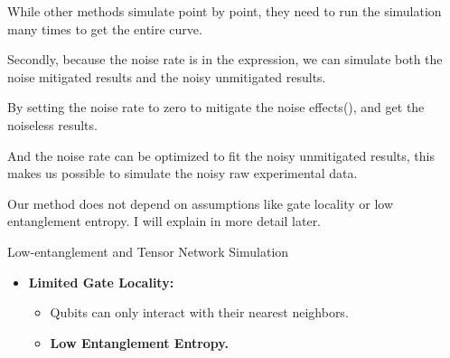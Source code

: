 \documentclass[10pt]{beamer}
\begin{document}
\begin{CJK}{UTF8}{gbsn}
{  While other methods simulate point by point, they need to run the simulation many times to get the entire curve.

  Secondly, because the noise rate is in the expression, we can simulate both the noise mitigated results and the noisy unmitigated results.
  
  By setting the noise rate to zero to mitigate the noise effects(), and get the noiseless results. 

  And the noise rate can be optimized to fit the noisy unmitigated results, this makes us possible to simulate the noisy raw experimental data.

  Our method does not depend on assumptions like gate locality or low entanglement entropy. I will explain in more detail later.
}

\begin{frame}[fragile]{Low-entanglement and Tensor Network Simulation}

  \begin{itemize}
    \item \textbf{Limited Gate Locality:}
    \begin{itemize}
        \item Qubits can only interact with their nearest neighbors.
        \item \textbf{Low Entanglement Entropy.}
    \end{itemize}
\end{itemize}


\end{frame}
\end{CJK}
\end{document}
